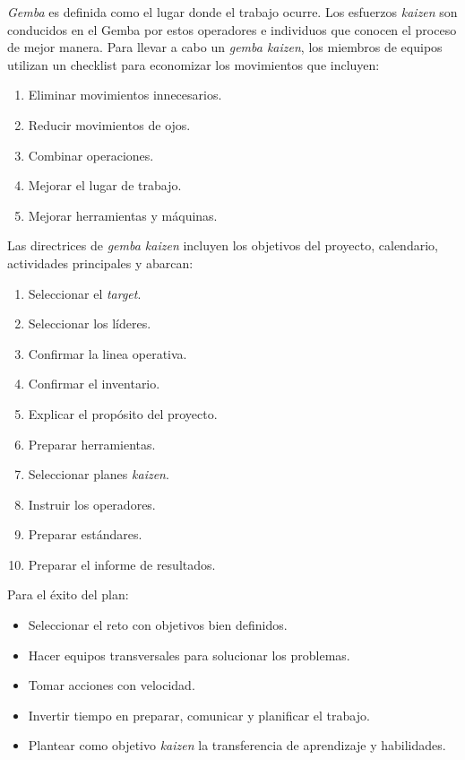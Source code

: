 \documentclass[]{article}
\begin{document}
\textit{Gemba} es definida como el lugar donde el trabajo ocurre. Los esfuerzos \textit{kaizen} son conducidos en el Gemba por estos operadores e individuos que conocen el proceso de mejor manera. Para llevar a cabo un \textit{gemba kaizen}, los miembros de equipos utilizan un checklist para economizar los movimientos que incluyen:

\begin{enumerate}
	\item Eliminar movimientos innecesarios.
	\item Reducir movimientos de ojos.
	\item Combinar operaciones.
	\item Mejorar el lugar de trabajo.
	\item Mejorar herramientas y máquinas.
\end{enumerate}

Las directrices de \textit{gemba kaizen} incluyen los objetivos del proyecto, calendario, actividades principales y abarcan:
\begin{enumerate}
	\item Seleccionar el \textit{target}.
	\item Seleccionar los líderes.
	\item Confirmar la linea operativa.
	\item Confirmar el inventario.
	\item Explicar el propósito del proyecto.
	\item Preparar herramientas.
	\item Seleccionar planes \textit{kaizen}.
	\item Instruir los operadores.
	\item Preparar estándares.
	\item Preparar el informe de resultados.
\end{enumerate}

Para el éxito del plan:
\begin{itemize}
	\item Seleccionar el reto con objetivos bien definidos.
	\item Hacer equipos transversales para solucionar los problemas.
	\item Tomar acciones con velocidad.
	\item Invertir tiempo en preparar, comunicar y planificar el trabajo.
	\item Plantear como objetivo \textit{kaizen} la transferencia de aprendizaje y habilidades.
\end{itemize}
\end{document}
